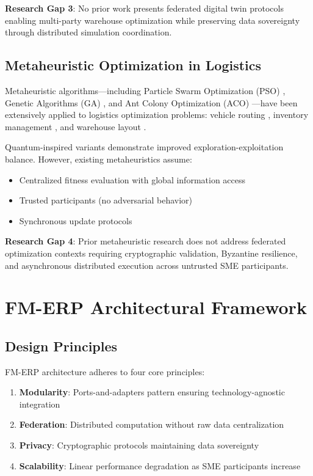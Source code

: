 \documentclass[times,10pt,twocolumn]{jucs2e}
\begin{document}
\textbf{Research Gap 3}: No prior work presents federated digital twin protocols enabling multi-party warehouse optimization while preserving data sovereignty through distributed simulation coordination.

\subsection{Metaheuristic Optimization in Logistics}

Metaheuristic algorithms---including Particle Swarm Optimization (PSO) \cite{Kennedy1995}, Genetic Algorithms (GA) \cite{Holland1975}, and Ant Colony Optimization (ACO) \cite{Dorigo1996}---have been extensively applied to logistics optimization problems: vehicle routing \cite{Laporte2009}, inventory management \cite{Minner2003}, and warehouse layout \cite{Roodbergen2009}.

Quantum-inspired variants \cite{Sun2004} demonstrate improved exploration-exploitation balance. However, existing metaheuristics assume:
\begin{itemize}
\item Centralized fitness evaluation with global information access
\item Trusted participants (no adversarial behavior)
\item Synchronous update protocols
\end{itemize}

\textbf{Research Gap 4}: Prior metaheuristic research does not address federated optimization contexts requiring cryptographic validation, Byzantine resilience, and asynchronous distributed execution across untrusted SME participants.


\section{FM-ERP Architectural Framework}

\subsection{Design Principles}

FM-ERP architecture adheres to four core principles:

\begin{enumerate}
\item \textbf{Modularity}: Ports-and-adapters pattern \cite{Cockburn2005} ensuring technology-agnostic integration
\item \textbf{Federation}: Distributed computation without raw data centralization
\item \textbf{Privacy}: Cryptographic protocols maintaining data sovereignty
\item \textbf{Scalability}: Linear performance degradation as SME participants increase
\end{enumerate}
\end{document}

